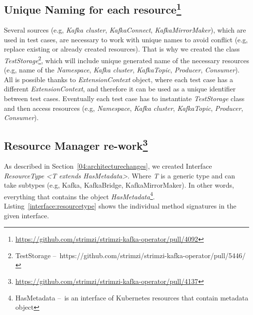 \subsection{Unique Naming for each resource\protect\footnote{\url{https://github.com/strimzi/strimzi-kafka-operator/pull/4092}}}
\label{05:sub:sec:unique}

Several sources (e.g, \emph{Kafka cluster}, \emph{KafkaConnect}, \emph{KafkaMirrorMaker}), which are used in test cases,
are necessary to work with unique names to avoid conflict (e.g, replace existing or already created resources).
That is why we created the class \emph{TestStorage}\footnote{TestStorage \---\ https://github.com/strimzi/strimzi-kafka-operator/pull/5446/},
which will include unique generated name of the necessary resources (e.g, name of the \emph{Namespace}, \emph{Kafka cluster},
\emph{KafkaTopic}, \emph{Producer}, \emph{Consumer}).
All is possible thanks to \emph{ExtensionContext} object, where each test case has a different \emph{ExtensionContext}, and therefore it can be used as a unique identifier between test cases.
Eventually each test case has to instantiate \emph{TestStorage} class and then access resources (e.g, \emph{Namespace}, \emph{Kafka cluster},
\emph{KafkaTopic}, \emph{Producer}, \emph{Consumer}).

\subsection{Resource Manager re-work\protect\footnote{\url{https://github.com/strimzi/strimzi-kafka-operator/pull/4137}}}
\label{05:sub:sec:resourcemanager}

As described in Section~\ref{04:architecturechanges}, we created Interface \emph{ResourceType <T extends HasMetadata>}.
Where \emph{T} is a generic type and can take subtypes (e.g, Kafka, KafkaBridge, KafkaMirrorMaker).
In other words, everything that contains the object \emph{HasMetadata}\footnote{HasMetadata \---\ is an interface of
Kubernetes resources that contain metadata object}.
Listing~\ref{interface:resourcetype} shows the individual method signatures in the given interface.

